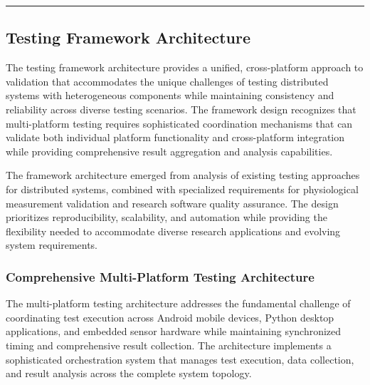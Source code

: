 \documentclass[11pt,a4paper]{report}
\begin{document}
\hrule

\subsection{Testing Framework Architecture}

The testing framework architecture provides a unified, cross-platform approach to validation that accommodates the
unique challenges of testing distributed systems with heterogeneous components while maintaining consistency and
reliability across diverse testing scenarios. The framework design recognizes that multi-platform testing requires
sophisticated coordination mechanisms that can validate both individual platform functionality and cross-platform
integration while providing comprehensive result aggregation and analysis capabilities.

The framework architecture emerged from analysis of existing testing approaches for distributed systems, combined with
specialized requirements for physiological measurement validation and research software quality assurance. The design
prioritizes reproducibility, scalability, and automation while providing the flexibility needed to accommodate diverse
research applications and evolving system requirements.

\subsubsection{Comprehensive Multi-Platform Testing Architecture}

The multi-platform testing architecture addresses the fundamental challenge of coordinating test execution across
Android mobile devices, Python desktop applications, and embedded sensor hardware while maintaining synchronized timing
and comprehensive result collection. The architecture implements a sophisticated orchestration system that manages test
execution, data collection, and result analysis across the complete system topology.
\end{document}
